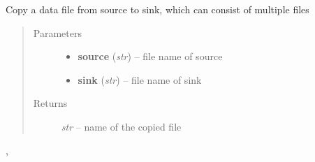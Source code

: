 \documentclass[letterpaper,10pt,english]{sphinxmanual}
\begin{document}

\begin{fulllineitems}
\label{api/ClearMap.IO:ClearMap.IO.IO.copyData}
Copy a data file from source to sink, which can consist of multiple files
\begin{quote}\begin{description}
\item[{Parameters}] \leavevmode\begin{itemize}
\item {} 
\textbf{source} (\emph{str}) --
file name of source

\item {} 
\textbf{sink} (\emph{str}) --
file name of sink

\end{itemize}

\item[{Returns}] \leavevmode
\emph{str} --
name of the copied file

\end{description}\end{quote}




{\hyperref[api/ClearMap.IO:ClearMap.IO.IO.copyFile]{\emph{}}}, {\hyperref[api/ClearMap.IO:ClearMap.IO.IO.convertData]{\emph{}}}



\end{fulllineitems}

\end{document}
